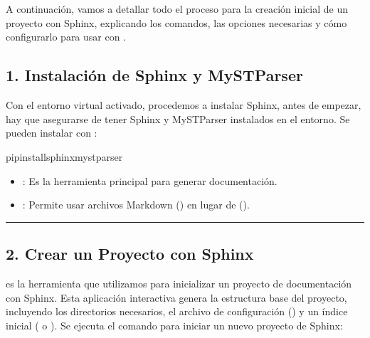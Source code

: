 \documentclass[a4paper,10pt,spanish]{sphinxmanual}
\begin{document}
\sphinxstepscope


\section{}
\label{\detokenize{configuracion_inicial/003.Creacion_proyecto_Sphinx:creacion-inicial-del-proyecto-con-sphinx}}\label{\detokenize{configuracion_inicial/003.Creacion_proyecto_Sphinx::doc}}
\sphinxAtStartPar
A continuación, vamos a detallar todo el proceso para la creación inicial de un proyecto con Sphinx, explicando los comandos, las opciones necesarias y cómo configurarlo para usar  con .


\subsection{1. Instalación de Sphinx y MyST\sphinxhyphen{}Parser}
\label{\detokenize{configuracion_inicial/003.Creacion_proyecto_Sphinx:instalacion-de-sphinx-y-myst-parser}}
\sphinxAtStartPar
Con el entorno virtual activado, procedemos a instalar Sphinx, antes de empezar, hay que asegurarse de tener Sphinx y MyST\sphinxhyphen{}Parser instalados en el entorno. Se pueden instalar con :

\begin{sphinxVerbatim}[commandchars=\\\{\}]
pipinstallsphinxmyst\PYGZhy{}parser
\end{sphinxVerbatim}
\begin{itemize}
\item {} 
\sphinxAtStartPar
{}: Es la herramienta principal para generar documentación.

\item {} 
\sphinxAtStartPar
{}: Permite usar archivos Markdown () en lugar de  ().

\end{itemize}


\bigskip\hrule\bigskip



\subsection{2. Crear un Proyecto con Sphinx}
\label{\detokenize{configuracion_inicial/003.Creacion_proyecto_Sphinx:crear-un-proyecto-con-sphinx}}
\sphinxAtStartPar
{} es la herramienta que utilizamos para inicializar un proyecto de documentación con Sphinx.
Esta aplicación interactiva genera la estructura base del proyecto, incluyendo los directorios necesarios, el archivo de configuración () y un índice inicial ( o ).
Se ejecuta el comando para iniciar un nuevo proyecto de Sphinx:
\end{document}
